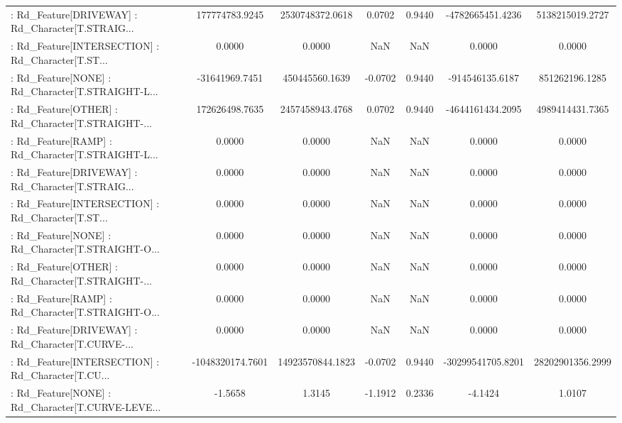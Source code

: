 \begin{longtable}{p{4cm}cccccc}
 : Rd\_Feature[DRIVEWAY] : Rd\_Character[T.STRAIG... &    177774783.9245 &   2530748372.0618 &  0.0702 &       0.9440 &   -4782665451.4236 &   5138215019.2727 \\
 : Rd\_Feature[INTERSECTION] : Rd\_Character[T.ST... &            0.0000 &            0.0000 &     NaN &          NaN &             0.0000 &            0.0000 \\
 : Rd\_Feature[NONE] : Rd\_Character[T.STRAIGHT-L... &    -31641969.7451 &    450445560.1639 & -0.0702 &       0.9440 &    -914546135.6187 &    851262196.1285 \\
 : Rd\_Feature[OTHER] : Rd\_Character[T.STRAIGHT-... &    172626498.7635 &   2457458943.4768 &  0.0702 &       0.9440 &   -4644161434.2095 &   4989414431.7365 \\
 : Rd\_Feature[RAMP] : Rd\_Character[T.STRAIGHT-L... &            0.0000 &            0.0000 &     NaN &          NaN &             0.0000 &            0.0000 \\
 : Rd\_Feature[DRIVEWAY] : Rd\_Character[T.STRAIG... &            0.0000 &            0.0000 &     NaN &          NaN &             0.0000 &            0.0000 \\
 : Rd\_Feature[INTERSECTION] : Rd\_Character[T.ST... &            0.0000 &            0.0000 &     NaN &          NaN &             0.0000 &            0.0000 \\
 : Rd\_Feature[NONE] : Rd\_Character[T.STRAIGHT-O... &            0.0000 &            0.0000 &     NaN &          NaN &             0.0000 &            0.0000 \\
 : Rd\_Feature[OTHER] : Rd\_Character[T.STRAIGHT-... &            0.0000 &            0.0000 &     NaN &          NaN &             0.0000 &            0.0000 \\
 : Rd\_Feature[RAMP] : Rd\_Character[T.STRAIGHT-O... &            0.0000 &            0.0000 &     NaN &          NaN &             0.0000 &            0.0000 \\
 : Rd\_Feature[DRIVEWAY] : Rd\_Character[T.CURVE-... &            0.0000 &            0.0000 &     NaN &          NaN &             0.0000 &            0.0000 \\
 : Rd\_Feature[INTERSECTION] : Rd\_Character[T.CU... &  -1048320174.7601 &  14923570844.1823 & -0.0702 &       0.9440 &  -30299541705.8201 &  28202901356.2999 \\
 : Rd\_Feature[NONE] : Rd\_Character[T.CURVE-LEVE... &           -1.5658 &            1.3145 & -1.1912 &       0.2336 &            -4.1424 &            1.0107 \\

\end{longtable}
